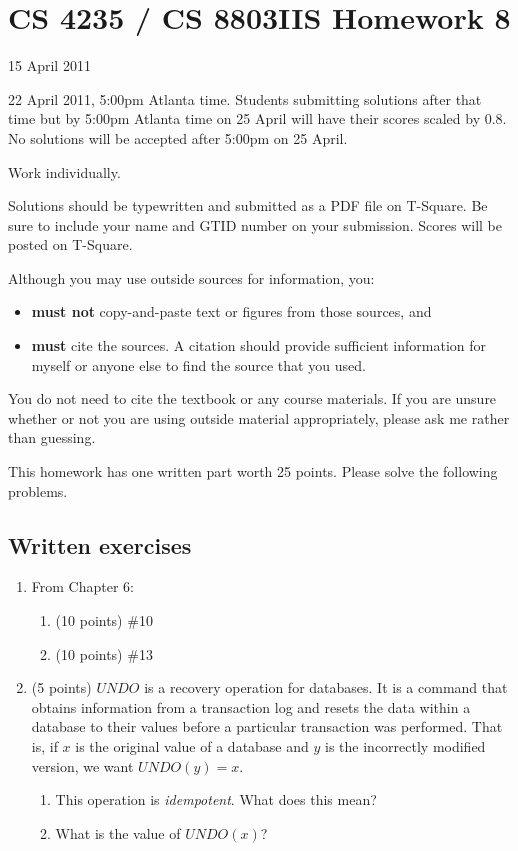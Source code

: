 \documentclass[letterpaper]{article}
\title{}
\date{}
\begin{document}
\thispagestyle{empty}

\section*{CS 4235 / CS 8803IIS Homework 8}

 15 April 2011

 22 April 2011, 5:00pm Atlanta time. Students submitting solutions after that time but by 5:00pm Atlanta time on 25 April will have their scores scaled by 0.8. No solutions will be accepted after 5:00pm on 25 April.

 Work individually.

\bigskip\noindent
Solutions should be typewritten and submitted as a PDF file on T-Square. Be sure to include your name and GTID number on your submission. Scores will be posted on T-Square.

\bigskip\noindent
Although you may use outside sources for information, you:
\begin{itemize}
\item {\bf must not} copy-and-paste text or figures from those sources, and
\item {\bf must} cite the sources. A citation should provide sufficient information for myself or anyone else to find the source that you used.
\end{itemize}
You do not need to cite the textbook or any course materials. If you are unsure whether or not you are using outside material appropriately, please ask me rather than guessing.

This homework has one written part worth 25 points. Please solve the following problems.

\subsection*{Written exercises}

\begin{enumerate}

\item From Chapter 6:
\begin{enumerate}
\item (10 points) \#10
\item (10 points) \#13
\end{enumerate}

\item (5 points) $UNDO$ is a recovery operation for databases. It is a command that obtains information from a transaction log and resets the data within a database to their values before a particular transaction was performed. That is, if $x$ is the original value of a database and $y$ is the incorrectly modified version, we want $UNDO(y)=x$.
\begin{enumerate}
\item This operation is {\em idempotent}. What does this mean?
\item What is the value of $UNDO(x)$?
\end{enumerate}

\end{enumerate}
\end{document}
